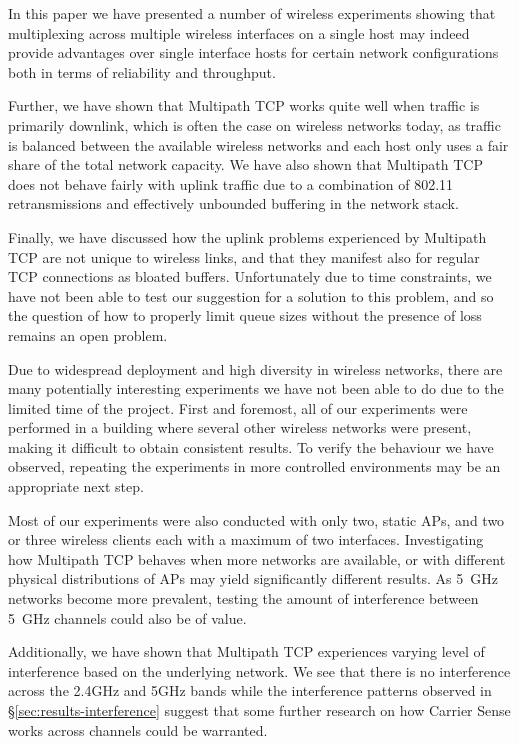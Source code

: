 In this paper we have presented a number of wireless experiments showing that
multiplexing across multiple wireless interfaces on a single host may indeed
provide advantages over single interface hosts for certain network
configurations both in terms of reliability and throughput.


Further, we have shown that Multipath TCP works quite well when traffic is
primarily downlink, which is often the case on wireless networks today, as 
traffic is balanced between the available wireless networks and each host only 
uses a fair share of the total network capacity. We have also shown that 
Multipath TCP does not behave fairly with uplink traffic due to a combination of 
802.11 retransmissions and effectively unbounded buffering in the network stack.

Finally, we have discussed how the uplink problems experienced by Multipath TCP
are not unique to wireless links, and that they manifest also for regular TCP
connections as bloated buffers. Unfortunately due to time constraints, we have 
not been able to test our suggestion for a solution to this problem, and so the 
question of how to properly limit queue sizes without the presence of loss 
remains an open problem.

Due to widespread deployment and high diversity in wireless networks, there
are many potentially interesting experiments we have not been able to do due to
the limited time of the project. First and foremost, all of our experiments were 
performed in a building where several other wireless networks were present, 
making it difficult to obtain consistent results. To verify the behaviour we 
have observed, repeating the experiments in more controlled environments may be 
an appropriate next step.

Most of our experiments were also conducted with only two, static APs, and two 
or three wireless clients each with a maximum of two interfaces. Investigating 
how Multipath TCP behaves when more networks are available, or with different 
physical distributions of APs may yield significantly different results. 
As 5~GHz networks become more prevalent, testing the amount of interference 
between 5~GHz channels could also be of value. 

Additionally, we have shown that Multipath TCP experiences varying level of 
interference based on the underlying network. We see that there is no 
interference across the 2.4GHz and 5GHz bands while the interference patterns 
observed in \S\ref{sec:results-interference} suggest that some further research 
on how Carrier Sense works across channels could be warranted.

